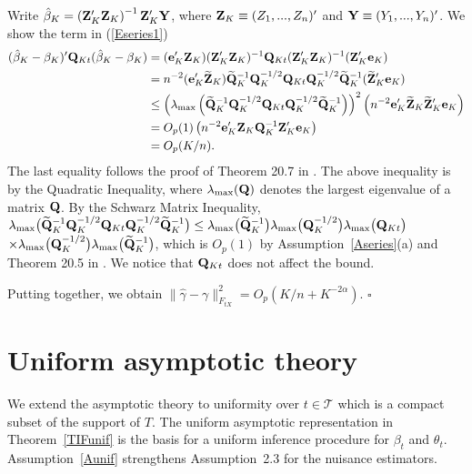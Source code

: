 \documentclass[lettersize, 12pt]{article}
\begin{document}
{Write $\hat \beta_K = \left({\bf Z}_K'{\bf Z}_K\right)^{-1}{\bf Z}_K' {\bf Y}$, where ${\bf Z}_K \equiv (Z_1,..., Z_n)'$ and ${\bf Y} \equiv (Y_1,...,Y_n)'$.
We show the term in (\ref{Eseries1})
\begin{align*}
(\hat\beta_K - \beta_K)'  {\bf Q}_{Kt}  (\hat\beta_K - \beta_K) &=
({\bf e}_K' {\bf Z}_K)({\bf Z}_K'{\bf Z}_K)^{-1} {\bf Q}_{Kt} ({\bf Z}_K'{\bf Z}_K)^{-1}({\bf Z}_K'{\bf e}_K)\\
&= n^{-2} ({\bf e}_K' \widetilde{\bf Z}_K)\widetilde{\bf Q}_{K}^{-1} {\bf Q}_{K}^{-1/2}{\bf Q}_{Kt} {\bf Q}_{K}^{-1/2}\widetilde{\bf Q}_{K}^{-1}(\widetilde{\bf Z}_K'{\bf e}_K)\\
&\leq \left(\lambda_{\max}\left( 
\widetilde{\bf Q}_{K}^{-1} {\bf Q}_{K}^{-1/2}{\bf Q}_{Kt} {\bf Q}_{K}^{-1/2}\widetilde{\bf Q}_{K}^{-1} 
 \right)\right)^2 \left( n^{-2} {\bf e}_K'\widetilde{\bf Z}_K \widetilde{\bf Z}_K'{\bf e}_K \right) \\
& = O_p(1) \left( n^{-2} {\bf e}_K'{\bf Z}_K{\bf Q}_{K}^{-1} {\bf Z}_K'{\bf e}_K \right)\\
& = O_p(K/n).
\end{align*}
The last equality follows the proof of Theorem 20.7 in \cite{HansenBook}.
The above inequality is by the Quadratic Inequality, where $\lambda_{\max}({\bf Q})$ denotes the largest eigenvalue of a matrix ${\bf Q}$.
By the Schwarz Matrix Inequality,
$\lambda_{\max}\big(  \widetilde{\bf Q}_{K}^{-1} {\bf Q}_{K}^{-1/2}{\bf Q}_{Kt} {\bf Q}_{K}^{-1/2}\widetilde{\bf Q}_{K}^{-1} 
 \big) \leq \lambda_{\max}\big( \widetilde{\bf Q}_{K}^{-1} \big)\lambda_{\max}\big({\bf Q}_{K}^{-1/2}\big)\lambda_{\max}\big({\bf Q}_{Kt} \big)$
 \\
 $\times\lambda_{\max}\big({\bf Q}_{K}^{-1/2}\big)\lambda_{\max}\big(\widetilde{\bf Q}_{K}^{-1} 
 \big)$, which is $O_p(1)$ by Assumption~\ref{Aseries}(a) and Theorem 20.5 in \cite{HansenBook}.
We notice that ${\bf Q}_{Kt}$ does not affect the bound.

Putting together, we obtain $\|\hat\gamma-\gamma\|_{F_{tX}}^2 = O_p(K/n + K^{-2\alpha})$.
\hfill $\square$



\section{Uniform asymptotic theory}
\label{SecUnif}
We extend the asymptotic theory to uniformity over 
$t \in \mathcal{T}$ which is a compact subset of the support of $T$.
The uniform asymptotic representation in Theorem~\ref{TIFunif} is the basis for a uniform inference procedure for $\beta_t$ and $\theta_t$.
Assumption~\ref{Aunif} strengthens Assumption~2.3 for the nuisance estimators. 

}
\end{document}
